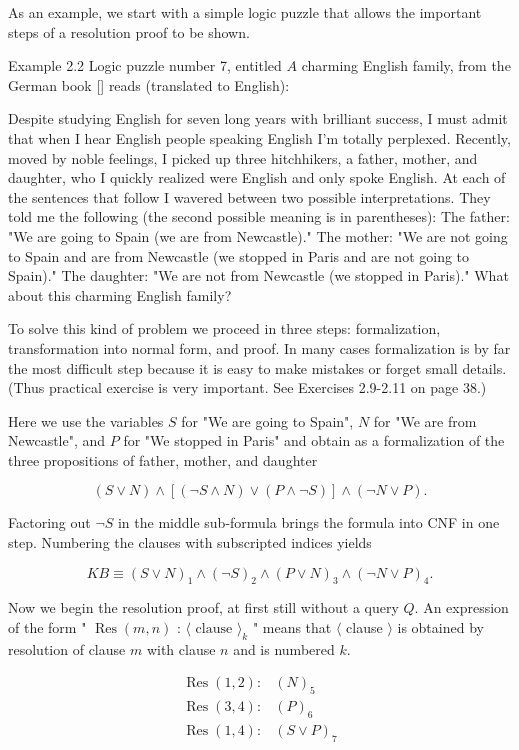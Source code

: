 \documentclass[10pt]{article}
\begin{document}
As an example, we start with a simple logic puzzle that allows the important steps of a resolution proof to be shown.

Example 2.2 Logic puzzle number 7, entitled $A$ charming English family, from the German book [\cite{berrondo1989fallgruben}] reads (translated to English):


Despite studying English for seven long years with brilliant success, I must admit that when I hear English people speaking English I'm totally perplexed. Recently, moved by noble feelings, I picked up three hitchhikers, a father, mother, and daughter, who I quickly realized were English and only spoke English. At each of the sentences that follow I wavered between two possible interpretations. They told me the following (the second possible meaning is in parentheses): The father: "We are going to Spain (we are from Newcastle)." The mother: "We are not going to Spain and are from Newcastle (we stopped in Paris and are not going to Spain)." The daughter: "We are not from Newcastle (we stopped in Paris)." What about this charming English family?

To solve this kind of problem we proceed in three steps: formalization, transformation into normal form, and proof. In many cases formalization is by far the most difficult step because it is easy to make mistakes or forget small details. (Thus practical exercise is very important. See Exercises 2.9-2.11 on page 38.)

Here we use the variables $S$ for "We are going to Spain", $N$ for "We are from Newcastle", and $P$ for "We stopped in Paris" and obtain as a formalization of the three propositions of father, mother, and daughter

$$
(S \vee N) \wedge[(\neg S \wedge N) \vee(P \wedge \neg S)] \wedge(\neg N \vee P) .
$$

Factoring out $\neg S$ in the middle sub-formula brings the formula into CNF in one step. Numbering the clauses with subscripted indices yields

$$
K B \equiv(S \vee N)_{1} \wedge(\neg S)_{2} \wedge(P \vee N)_{3} \wedge(\neg N \vee P)_{4} .
$$

Now we begin the resolution proof, at first still without a query $Q$. An expression of the form " $\operatorname{Res}(m, n)$ : $\langle\text { clause }\rangle_{k}$ " means that $\langle$ clause $\rangle$ is obtained by resolution of clause $m$ with clause $n$ and is numbered $k$.

$$
\begin{array}{ll}
\operatorname{Res}(1,2): & (N)_{5} \\
\operatorname{Res}(3,4): & (P)_{6} \\
\operatorname{Res}(1,4): & (S \vee P)_{7}
\end{array}
$$
\end{document}
